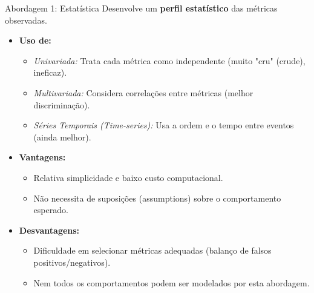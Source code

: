 \begin{frame}{Abordagem 1: Estatística}
    Desenvolve um \textbf{perfil estatístico} das métricas observadas.
    \begin{itemize}
        \item \textbf{Uso de:}
              \begin{itemize}
                  \item \textit{Univariada:} Trata cada métrica como independente (muito "cru" (crude), ineficaz).
                  \item \textit{Multivariada:} Considera correlações entre métricas (melhor discriminação).
                  \item \textit{Séries Temporais (Time-series):} Usa a ordem e o tempo entre eventos (ainda melhor).
              \end{itemize}

        \item \textbf{Vantagens:}
              \begin{itemize}
                  \item Relativa simplicidade e baixo custo computacional.
                  \item Não necessita de suposições (assumptions) sobre o comportamento esperado.
              \end{itemize}

        \item \textbf{Desvantagens:}
              \begin{itemize}
                  \item Dificuldade em selecionar métricas adequadas (balanço de falsos positivos/negativos).
                  \item Nem todos os comportamentos podem ser modelados por esta abordagem.
              \end{itemize}
    \end{itemize}
\end{frame}


